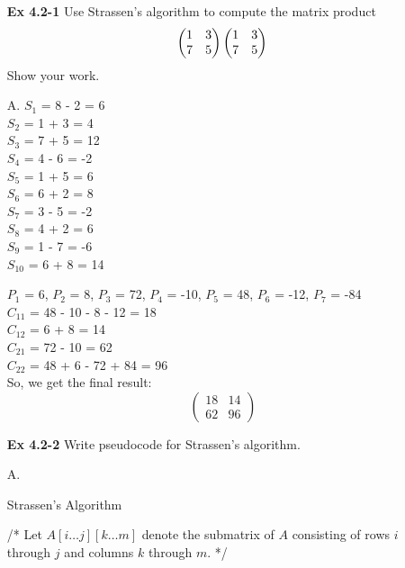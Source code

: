 \documentclass[fontsize=12pt,paper=a4]{book}
\newcommand{\Lcomment}[1]{\Statex /* #1 */}
\begin{document}
\begin{enumerate}
 \item[\textbf{Ex 4.2-1}]
       Use Strassen's algorithm to compute the matrix product\\
       \[
        \begin{pmatrix}	1 & 3 \\ 7 & 5 \end{pmatrix}
        \begin{pmatrix}	1 & 3 \\ 7 & 5 \end{pmatrix}\\
       \]
       Show your work.
 \item[A.]
       $S_1$ = 8 - 2 = 6\\
       $S_2$ = 1 + 3 = 4\\
       $S_3$ = 7 + 5 = 12\\
       $S_4$ = 4 - 6 = -2\\
       $S_5$ = 1 + 5 = 6\\
       $S_6$ = 6 + 2 = 8\\
       $S_7$ = 3 - 5 = -2\\
       $S_8$ = 4 + 2 = 6\\
       $S_9$ = 1 - 7 = -6\\
       $S_{10}$ = 6 + 8 = 14
       
       $P_1$ = 6, $P_2$ = 8, $P_3$ = 72,
       $P_4$ = -10, $P_5$ = 48, $P_6$ = -12,
       $P_7$ = -84\\
       
       $C_{11}$ = 48 - 10 - 8 - 12 = 18 \\
       $C_{12}$ = 6 + 8 = 14 \\
       $C_{21}$ = 72 - 10 = 62 \\
       $C_{22}$ = 48 + 6 - 72 + 84 = 96 \\
       So, we get the final result:
       \[
        \begin{pmatrix} 18 & 14 \\ 62 & 96 \end{pmatrix}
       \]
       
 \item[\textbf{Ex 4.2-2}]
       Write pseudocode for Strassen’s algorithm.
 \item[A.]
       \begin{algorithm}
        \caption{Strassen's Algorithm}
        \begin{algorithmic}
         \Lcomment{Let $A[i \dots j][k \dots m]$ denote the submatrix of $A$ consisting of rows $i$ through $j$ and columns $k$ through $m$.}
         

\end{algorithmic}
\end{algorithm}
\end{enumerate}
\end{document}
